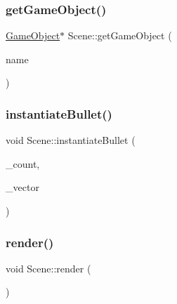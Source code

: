 \mbox{\label{class_scene_ab16e3d00711a57b59a0e05e0ed76b671}} 
\subsubsection{\texorpdfstring{get\+Game\+Object()}{getGameObject()}}
{\footnotesize\ttfamily \mbox{\hyperlink{class_game_object}{Game\+Object}}$\ast$ Scene\+::get\+Game\+Object (\begin{DoxyParamCaption}\item[{const std\+::string \&}]{name }\end{DoxyParamCaption})}

\mbox{\label{class_scene_a9f729eae7d79fb819e046fbf6f2528e8}} 
\subsubsection{\texorpdfstring{instantiate\+Bullet()}{instantiateBullet()}}
{\footnotesize\ttfamily void Scene\+::instantiate\+Bullet (\begin{DoxyParamCaption}\item[{int}]{\+\_\+count,  }\item[{bt\+Vector3 \&}]{\+\_\+vector }\end{DoxyParamCaption})}

\mbox{\label{class_scene_a4ddf2d16f371ee9533b3faf1dd5ddfb1}} 
\subsubsection{\texorpdfstring{render()}{render()}}
{\footnotesize\ttfamily void Scene\+::render (\begin{DoxyParamCaption}{ }\end{DoxyParamCaption})\hspace{0.3cm}{\ttfamily [inline]}}

\mbox{\label{class_scene_ad02fae80f6ee49025fa6ff7e68c96081}} 
